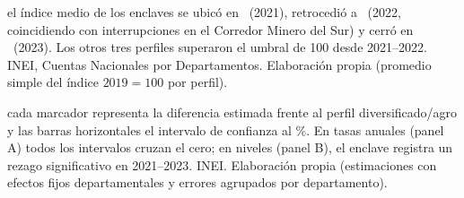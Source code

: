 \documentclass[aspectratio=169,11pt]{beamer}
\begin{document}
{ el índice medio de los enclaves se ubicó en \EnclaveFirst\ (2021), retrocedió a \EnclaveSecond\ (2022, coincidiendo con interrupciones en el Corredor Minero del Sur) y cerró en \EnclaveThird\ (2023). Los otros tres perfiles superaron el umbral de 100 desde 2021--2022.}
{INEI, Cuentas Nacionales por Departamentos. Elaboración propia (promedio simple del índice $2019=100$ por perfil).}

{ cada marcador representa la diferencia estimada frente al perfil diversificado/agro y las barras horizontales el intervalo de confianza al \ConfidencePct\%. En tasas anuales (panel A) todos los intervalos cruzan el cero; en niveles (panel B), el enclave registra un rezago significativo en 2021--2023.}
{INEI. Elaboración propia (estimaciones con efectos fijos departamentales y errores agrupados por departamento).}
\end{document}
